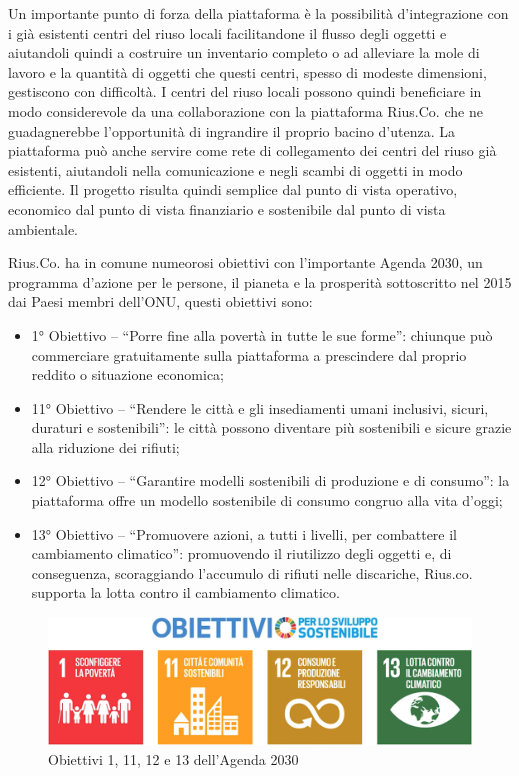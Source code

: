 Un importante punto di forza della piattaforma è la possibilità d'integrazione con i già esistenti centri del riuso locali facilitandone il flusso degli oggetti e aiutandoli quindi a costruire un inventario completo o ad alleviare la mole di lavoro e la quantità di oggetti che questi centri, spesso di modeste dimensioni, gestiscono con difficoltà. I centri del riuso locali possono quindi beneficiare in modo considerevole da una collaborazione con la piattaforma Rius.Co. che ne guadagnerebbe l'opportunità di ingrandire il proprio bacino d'utenza. 
La piattaforma può anche servire come rete di collegamento dei centri del riuso già esistenti, aiutandoli nella comunicazione e negli scambi di oggetti in modo efficiente. Il progetto risulta quindi semplice dal punto di vista operativo, economico dal punto di vista finanziario e sostenibile dal punto di vista ambientale. 
\medskip

Rius.Co. ha in comune numeorosi obiettivi con l'importante Agenda 2030, un programma d'azione per le persone, il pianeta e la prosperità sottoscritto nel 2015 dai Paesi membri dell'ONU, questi obiettivi sono: 
\begin{itemize}
    \item 1° Obiettivo – “Porre fine alla povertà in tutte le sue forme”: chiunque può commerciare gratuitamente sulla piattaforma a prescindere dal proprio reddito o situazione economica; 
    \item 11° Obiettivo – “Rendere le città e gli insediamenti umani inclusivi, sicuri, duraturi e sostenibili”: le città possono diventare più sostenibili e sicure grazie alla riduzione dei rifiuti; 
    \item 12° Obiettivo – “Garantire modelli sostenibili di produzione e di consumo”: la piattaforma offre un modello sostenibile di consumo congruo alla vita d'oggi; 
    \item 13° Obiettivo – “Promuovere azioni, a tutti i livelli, per combattere il cambiamento climatico”: promuovendo il riutilizzo degli oggetti e, di conseguenza, scoraggiando l'accumulo di rifiuti nelle discariche, Rius.co. supporta la lotta contro il cambiamento climatico. 
\end{itemize}
\begin{figure}[hb]
    \centering\includegraphics[scale=0.1]{images/agenda_2030.png}
    \caption{Obiettivi 1, 11, 12 e 13 dell'Agenda 2030}
\end{figure}
\clearpage
